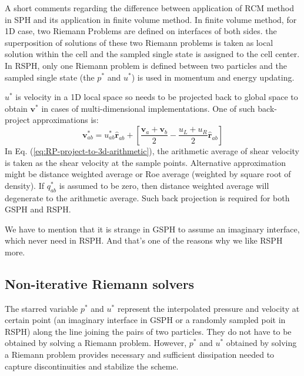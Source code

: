 A short comments regarding the difference between application of RCM method in SPH and its application in finite volume method. In finite volume method, for 1D case, two Riemann Problems are defined on interfaces of both sides. the superposition of solutions of these two Riemann problems is taken as local solution within the cell and the sampled single state is assigned to the cell center. In RSPH, only one Riemann problem is defined between two particles and the sampled single state (the $p^{\ast}$ and $u^{\ast}$) is used in momentum and energy updating.

$u^{\ast}$ is velocity in a 1D local space so needs to be projected back to global space to obtain $\textbf{v}^{\ast}$ in cases of multi-dimensional implementations. One of such back-project approximations is:
\begin{equation}
\textbf{v}^{\ast}_{a b}=u^{\ast}_{a b} \hat{\textbf{r}}_{a b} + \left [\frac{\textbf{v}_{a} + \textbf{v}_{b}}{2} - \frac{u_L + u_R}{2} \hat{\textbf{r}}_{a b}\right]
\label{eq:RP-project-to-3d-arithmetic}
\end{equation}
In Eq. (\ref{eq:RP-project-to-3d-arithmetic}), the arithmetic average of shear velocity is taken as the shear velocity at the sample points. Alternative approximation might be distance weighted average or Roe average (weighted by square root of density). If $q_{a b}^{\ast}$ is assumed to be zero, then distance weighted average will degenerate to the arithmetic average.
Such back projection is required for both GSPH and RSPH.

We have to mention that it is strange in GSPH to assume an imaginary interface, which never need in RSPH. And that's one of the reasons why we like RSPH more.

\subsection{Non-iterative Riemann solvers} \label{sec:RP-solver}
The starred variable $p^{\ast}$ and $u^{\ast}$ represent the interpolated pressure and velocity at certain point (an imaginary interface in GSPH or a randomly sampled poit in RSPH) along the line joining the pairs of two particles. They do not have to be obtained by solving a Riemann problem. However, $p^{\ast}$ and $u^{\ast}$ obtained by solving a Riemann problem provides necessary and sufficient dissipation needed to capture discontinuities and stabilize the scheme.

